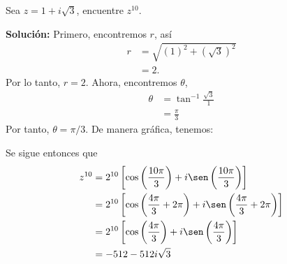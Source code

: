 \begin{myexample}
    Sea $z = 1 + i\sqrt{3}$, encuentre $z^{10}$.

    \tcblower
    \textbf{\color{jblueleft}Solución:} Primero, encontremos $r$, así
    \begin{align*}
        r & = \sqrt{(1)^2 + \left( \sqrt{3} \right)^2} \\
        & = 2.
    \end{align*}
    Por lo tanto, $r = 2$. Ahora, encontremos $\theta$,
    \begin{align*}
        \theta & = \tan^{-1} \frac{\sqrt{3}}{1} \\
        & = \frac{\pi}{3}
    \end{align*}
    Por tanto, $\theta = \pi/3$. De  manera gráfica, tenemos:
    \begin{center}
    \end{center}
    Se sigue entonces que
    \begin{align*}
        z^{10} & = 2^{10} \left[ \cos \left(\frac{10\pi}{3}\right) + i \sen \left(\frac{10\pi}{3}\right) \right] \\
        & = 2^{10} \left[ \cos \left(\frac{4\pi}{3}+2\pi\right) + i \sen \left(\frac{4\pi}{3}+2\pi\right) \right] \\
        & = 2^{10} \left[ \cos \left(\frac{4\pi}{3}\right) + i \sen \left(\frac{4\pi}{3}\right) \right] \\
        & = -512 - 512 i \sqrt{3}
    \end{align*}
\end{myexample}

